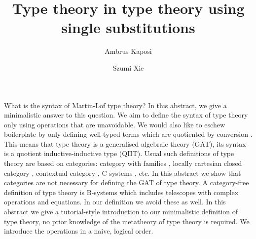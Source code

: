 \documentclass{easychair}
\title{Type theory in type theory using single substitutions}
\author{
Ambrus Kaposi
\and
Szumi Xie
}
\institute{
   Eötvös Loránd University,
   Budapest, Hungary, 
   \email{\{akaposi|szumi\}@inf.elte.hu}
}
\begin{document}
\maketitle

\newcommand{\Ra}{\Rightarrow}
\newcommand{\ra}{\rightarrow}
\newcommand{\Con}{\mathsf{Con}}
\newcommand{\Var}{\mathsf{Var}}
\newcommand{\var}{\mathsf{var}}
\newcommand{\Tm}{\mathsf{Tm}}
\newcommand{\Ty}{\mathsf{Ty}}
\newcommand{\Sub}{\mathsf{Sub}}
\newcommand{\U}{\mathsf{U}}
\newcommand{\El}{\mathsf{El}}
\renewcommand{\c}{\mathsf{c}}
\newcommand{\lam}{\mathsf{lam}}
\newcommand{\app}{\mathsf{app}}
\newcommand{\oldapp}{\mathbin{\cdot}}
\renewcommand{\tt}{\mathsf{tt}}
\newcommand{\Br}{\mathsf{Br}}
\newcommand{\aps}{\mathsf{aps}}
\newcommand{\ap}{\mathsf{ap}}
\newcommand{\mkBrPi}{\mathsf{mkBr}{\Pi}}
\newcommand{\Gel}{\mathsf{Gel}}
\newcommand{\gel}{\mathsf{gel}}
\newcommand{\ungel}{\mathsf{ungel}}
\renewcommand{\sp}{\hspace{1.5em}}
\newcommand{\blank}{\mathord{\hspace{1pt}\text{--}\hspace{1pt}}} %
\newcommand{\Set}{\mathsf{Set}}
\newcommand{\ext}{\mathop{\triangleright}}
\newcommand{\R}{\mathsf{R}}
\newcommand{\p}{\mathsf{p}}
\renewcommand{\S}{\mathsf{S}}
\newcommand{\vz}{\mathsf{vz}}
\newcommand{\vs}{\mathsf{vs}}

What is the syntax of Martin-Löf type theory? In this abstract, we
give a minimalistic answer to this question. We aim to define the
syntax of type theory only using operations that are unavoidable. We
would also like to eschew boilerplate by only defining well-typed terms
which are quotiented by conversion
\cite{DBLP:conf/popl/AltenkirchK16}. This means that type theory is a
generalised algebraic theory (GAT), its syntax is a quotient
inductive-inductive type (QIIT). Usual such definitions of type theory are
based on categories: category with families \cite{DBLP:journals/corr/abs-1904-00827}, locally cartesian closed
category \cite{Seely1984-SEELCC,DBLP:journals/mscs/ClairambaultD14}, contextual category \cite{DBLP:journals/apal/Cartmell86,initiality-agda}, C systems \cite{AHRENS_EMMENEGGER_NORTH_RIJKE_2023}, etc. In this abstract we
show that categories are not necessary for defining the GAT of type
theory. A category-free definition of type theory is B-systems \cite{AHRENS_EMMENEGGER_NORTH_RIJKE_2023} which
includes telescopes with complex operations and equations. In our
definition we avoid these as well. In this abstract we give a
tutorial-style introduction to our minimalistic definition of type
theory, no prior knowledge of the metatheory of type theory is
required. We introduce the operations in a naive, logical order.
\end{document}
